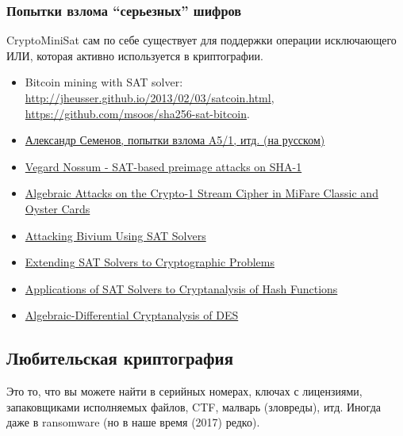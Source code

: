 \subsubsection{Попытки взлома ``серьезных'' шифров}

CryptoMiniSat сам по себе существует для поддержки операции исключающего ИЛИ, которая активно используется
в криптографии.

\begin{itemize}
\item Bitcoin mining with SAT solver: \url{http://jheusser.github.io/2013/02/03/satcoin.html}, \url{https://github.com/msoos/sha256-sat-bitcoin}.

\item \href{http://2015.phdays.ru/program/dev/40400/}{Александр Семенов, попытки взлома A5/1, итд. (на русском)}

\item \href{https://yurichev.com/mirrors/SAT_SMT_crypto/thesis-output.pdf}{Vegard Nossum - SAT-based preimage attacks on SHA-1}

\item \href{https://yurichev.com/mirrors/SAT_SMT_crypto/166.pdf}{Algebraic Attacks on the Crypto-1 Stream Cipher in MiFare Classic and Oyster Cards}

\item \href{https://yurichev.com/mirrors/SAT_SMT_crypto/Attacking-Bivium-Using-SAT-Solvers.pdf}{Attacking Bivium Using SAT Solvers}

\item \href{https://yurichev.com/mirrors/SAT_SMT_crypto/Extending_SAT_2009.pdf}{Extending SAT Solvers to Cryptographic Problems}

\item \href{https://yurichev.com/mirrors/SAT_SMT_crypto/sat-hash.pdf}{Applications of SAT Solvers to Cryptanalysis of Hash Functions}

\item \href{https://yurichev.com/mirrors/SAT_SMT_crypto/slidesC2DES.pdf}{Algebraic-Differential Cryptanalysis of DES}

\end{itemize}

\subsection{Любительская криптография}

Это то, что вы можете найти в серийных номерах, ключах с лицензиями, запаковщиками исполняемых файлов, \ac{CTF},
малварь (зловреды), итд.
Иногда даже в ransomware (но в наше время (2017) редко).

